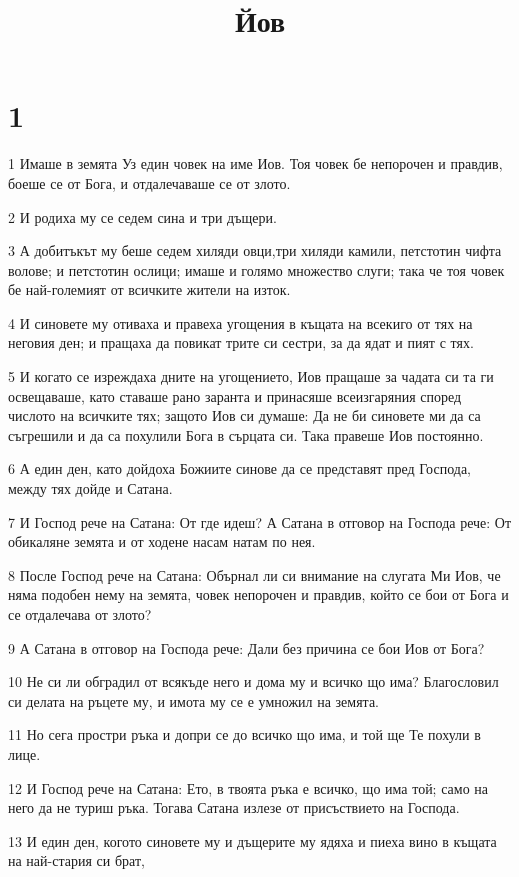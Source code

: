 

\title{Йов}


\chapter{1}

\par 1 Имаше в земята Уз един човек на име Иов. Тоя човек бе непорочен и правдив, боеше се от Бога, и отдалечаваше се от злото.
\par 2 И родиха му се седем сина и три дъщери.
\par 3 А добитъкът му беше седем хиляди овци,три хиляди камили, петстотин чифта волове; и петстотин ослици; имаше и голямо множество слуги; така че тоя човек бе най-големият от всичките жители на изток.
\par 4 И синовете му отиваха и правеха угощения в къщата на всекиго от тях на неговия ден; и пращаха да повикат трите си сестри, за да ядат и пият с тях.
\par 5 И когато се изреждаха дните на угощението, Иов пращаше за чадата си та ги освещаваше, като ставаше рано заранта и принасяше всеизгаряния според числото на всичките тях; защото Иов си думаше: Да не би синовете ми да са съгрешили и да са похулили Бога в сърцата си. Така правеше Иов постоянно.
\par 6 А един ден, като дойдоха Божиите синове да се представят пред Господа, между тях дойде и Сатана.
\par 7 И Господ рече на Сатана: От где идеш? А Сатана в отговор на Господа рече: От обикаляне земята и от ходене насам натам по нея.
\par 8 После Господ рече на Сатана: Обърнал ли си внимание на слугата Ми Иов, че няма подобен нему на земята, човек непорочен и правдив, който се бои от Бога и се отдалечава от злото?
\par 9 А Сатана в отговор на Господа рече: Дали без причина се бои Иов от Бога?
\par 10 Не си ли обградил от всякъде него и дома му и всичко що има? Благословил си делата на ръцете му, и имота му се е умножил на земята.
\par 11 Но сега простри ръка и допри се до всичко що има, и той ще Те похули в лице.
\par 12 И Господ рече на Сатана: Ето, в твоята ръка е всичко, що има той; само на него да не туриш ръка. Тогава Сатана излезе от присъствието на Господа.
\par 13 И един ден, когото синовете му и дъщерите му ядяха и пиеха вино в къщата на най-стария си брат,
